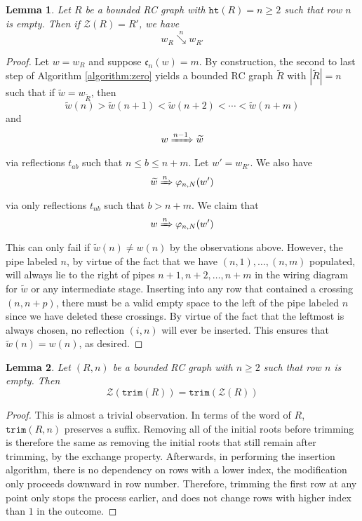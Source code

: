 \documentclass[a4paper,fleqn]{cas-sc}
\newtheorem{lemma}{Lemma}[subsection]
\theoremstyle{definition}
\theoremstyle{remark}
\numberwithin{equation}{subsection}
\newcommand{\downvar}[1]{\stackrel{#1}{\searrow}}
\newcommand{\wof}[1]{w_{#1}}
\newcommand{\Tom}[1]{\xRightarrow{#1}}
\newcommand{\trm}{\mathtt{trim}}
\newcommand{\zeromap}{\mathcal{Z}}
\newcommand{\hr}{\mathtt{ht}}
\newcommand{\code}{\mathfrak{c}}
\begin{document}
\begin{lemma} \label{lemma:zerotransition}
Let $R$ be a bounded RC graph with $\hr(R)=n\geq 2$ such that row $n$ is empty. Then if $\zeromap(R) = R'$, we have
$$\wof{R}\downvar{n} \wof{R'}$$
\end{lemma}
\begin{proof}
Let $w=\wof{R}$ and suppose $\code_n(w) = m$. By construction, the second to last step of Algorithm \ref{algorithm:zero} yields a bounded RC graph $\widetilde{R}$ with $|\widetilde{R}|=n$ such that if $\widetilde{w} = \wof{\widetilde{R}}$, then
$$\widetilde{w}(n) > \widetilde{w}(n+1) < \widetilde{w}(n+2) < \cdots < \widetilde{w}(n + m)$$
and
$$w\Tom{n-1}\widetilde{w}$$
via reflections $t_{ab}$ such that $n\leq b\leq n+m$. Let $w' = \wof{R'}$. We also have
$$\widetilde{w}\Tom{n}\varphi_{n, N}(w')$$
via only reflections $t_{nb}$ such that $b>n+m$. We claim that
$$w\Tom{n} \varphi_{n, N}(w')$$
This can only fail if $\widetilde{w}(n)\neq w(n)$ by the observations above. However, the pipe labeled $n$, by virtue of the fact that we have $(n,1),\ldots,(n,m)$ populated, will always lie to the right of pipes $n+1,n+2,\ldots,n+m$ in the wiring diagram for $\widetilde{w}$ or any intermediate stage. Inserting into any row that contained a crossing $(n, n+p)$, there must be a valid empty space to the left of the pipe labeled $n$ since we have deleted these crossings. By virtue of the fact that the leftmost is always chosen, no reflection $(i,n)$ will ever be inserted. This ensures that $\widetilde{w}(n) = w(n)$, as desired.
\end{proof}


\begin{lemma} \label{lemma:ztrim}
Let $(R, n)$ be a bounded RC graph with $n\geq 2$ such that row $n$ is empty. Then
$$\zeromap(\trm(R)) = \trm(\zeromap(R))$$
\end{lemma}
\begin{proof}
This is almost a trivial observation. In terms of the word of $R$, $\trm(R, n)$ preserves a suffix. Removing all of the initial roots before trimming is therefore the same as removing the initial roots that still remain after trimming, by the exchange property. Afterwards, in performing the insertion algorithm, there is no dependency on rows with a lower index, the modification only proceeds downward in row number. Therefore, trimming the first row at any point only stops the process earlier, and does not change rows with higher index than $1$ in the outcome.
\end{proof}
\end{document}

